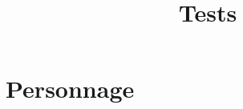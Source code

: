 \documentclass[a4paper, 11pt, notitlepage]{report}
\title{
  \huge Tests \\
}
\author{
  }
\date{}
\begin{document}
\maketitle


\section*{Personnage}
\end{document}
